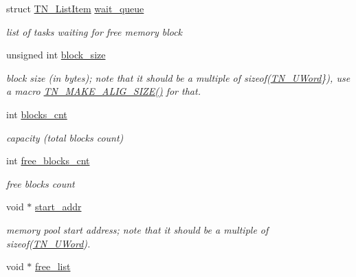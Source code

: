 \begin{DoxyCompactItemize}
\item 
\hypertarget{structTN__FMem_a63b47b05e191f4339509eef97027ca1c}{struct \hyperlink{structTN__ListItem}{T\+N\+\_\+\+List\+Item} \hyperlink{structTN__FMem_a63b47b05e191f4339509eef97027ca1c}{wait\+\_\+queue}}\label{structTN__FMem_a63b47b05e191f4339509eef97027ca1c}

\begin{DoxyCompactList}\small\item\em list of tasks waiting for free memory block \end{DoxyCompactList}\item 
unsigned int \hyperlink{structTN__FMem_a101e3e0eeb2774309a55ed1d6cad8e3f}{block\+\_\+size}
\begin{DoxyCompactList}\small\item\em block size (in bytes); note that it should be a multiple of {\ttfamily sizeof(\hyperlink{tn__arch__example_8h_ab80cba0fe9ffcd9011d53dfeb9e39bf4}{T\+N\+\_\+\+U\+Word}\})}, use a macro {\ttfamily \hyperlink{tn__common_8h_a3f48380e8a624edc643319a81192d88e}{T\+N\+\_\+\+M\+A\+K\+E\+\_\+\+A\+L\+I\+G\+\_\+\+S\+I\+Z\+E()}} for that. \end{DoxyCompactList}\item 
\hypertarget{structTN__FMem_a8c8bb7a3ac8228a865bbbea1edde9ea0}{int \hyperlink{structTN__FMem_a8c8bb7a3ac8228a865bbbea1edde9ea0}{blocks\+\_\+cnt}}\label{structTN__FMem_a8c8bb7a3ac8228a865bbbea1edde9ea0}

\begin{DoxyCompactList}\small\item\em capacity (total blocks count) \end{DoxyCompactList}\item 
\hypertarget{structTN__FMem_abf2618d6322b1339d7b3d60c6e080cb1}{int \hyperlink{structTN__FMem_abf2618d6322b1339d7b3d60c6e080cb1}{free\+\_\+blocks\+\_\+cnt}}\label{structTN__FMem_abf2618d6322b1339d7b3d60c6e080cb1}

\begin{DoxyCompactList}\small\item\em free blocks count \end{DoxyCompactList}\item 
void $\ast$ \hyperlink{structTN__FMem_a7eac768da37c99efd90ae56ebde527cf}{start\+\_\+addr}
\begin{DoxyCompactList}\small\item\em memory pool start address; note that it should be a multiple of {\ttfamily sizeof(\hyperlink{tn__arch__example_8h_ab80cba0fe9ffcd9011d53dfeb9e39bf4}{T\+N\+\_\+\+U\+Word})}. \end{DoxyCompactList}\item 
\hypertarget{structTN__FMem_a00ffa3c416a57946d95ab8814168eedb}{void $\ast$ \hyperlink{structTN__FMem_a00ffa3c416a57946d95ab8814168eedb}{free\+\_\+list}}\label{structTN__FMem_a00ffa3c416a57946d95ab8814168eedb}


\end{DoxyCompactItemize}
